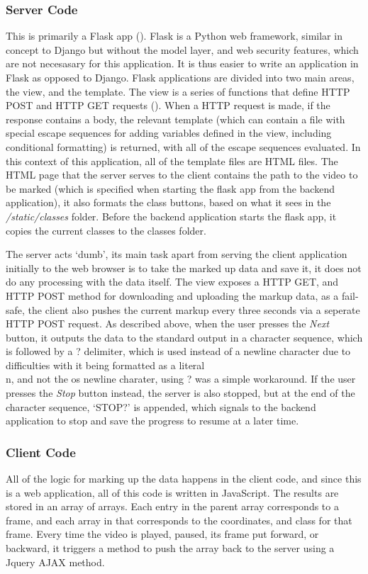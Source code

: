         \subsubsection{Server Code}
        This is primarily a Flask app (\cite{flaskpocoo}). Flask is a Python web framework, similar in concept to Django but without the model layer, and web security features, which are not necesasary for this application. It is thus easier to write an application in Flask as opposed to Django. Flask applications are divided into two main areas, the view, and the template. The view is a series of functions that define HTTP POST and HTTP GET requests (\cite{fielding1999hypertext}). When a HTTP request is made, if the response contains a body, the relevant template (which can contain a file with special escape sequences for adding variables defined in the view, including conditional formatting) is returned, with all of the escape sequences evaluated. In this context of this application, all of the template files are HTML files. The HTML page that the server serves to the client contains the path to the video to be marked (which is specified when starting the flask app from the backend application), it also formats the class buttons, based on what it sees in the {\slshape /static/classes} folder. Before the backend application starts the flask app, it copies the current classes to the classes folder.
        
        The server acts `dumb', its main task apart from serving the client application initially to the web browser is to take the marked up data and save it, it does not do any processing with the data itself. The view exposes a HTTP GET, and HTTP POST method for downloading and uploading the markup data, as a fail-safe, the client also pushes the current markup every three seconds via a seperate HTTP POST request. As described above, when the user presses the {\slshape Next} button, it outputs the data to the standard output in a character sequence, which is followed by a ? delimiter, which is used instead of a newline character due to difficulties with it being formatted as a literal \\n, and not the os newline charater, using ? was a simple workaround. If the user presses the {\slshape Stop} button instead, the server is also stopped, but at the end of the character sequence, `STOP?' is appended, which signals to the backend application to stop and save the progress to resume at a later time.

        \subsubsection{Client Code}
        All of the logic for marking up the data happens in the client code, and since this is a web application, all of this code is written in JavaScript. The results are stored in an array of arrays. Each entry in the parent array corresponds to a frame, and each array in that corresponds to the coordinates, and class for that frame. Every time the video is played, paused, its frame put forward, or backward, it triggers a method to push the array back to the server using a Jquery AJAX method.

